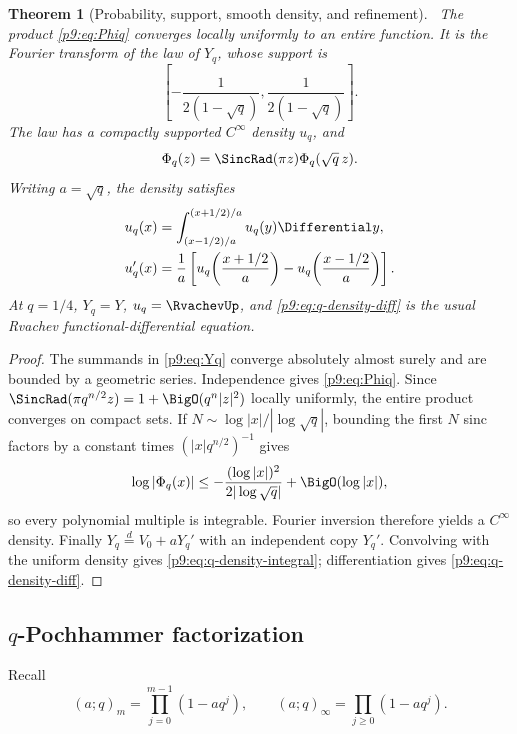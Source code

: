 \documentclass[11pt]{article}
\numberwithin{equation}{section}
\newtheorem{theorem}{Theorem}[section]
\theoremstyle{definition}
\theoremstyle{remark}
\begin{document}
\begin{theorem}[Probability, support, smooth density, and refinement]\label{p9:thm:q-density}
\statusN\ The product \eqref{p9:eq:Phiq} converges locally uniformly to an entire function.
It is the Fourier transform of the law of $Y_q$, whose support is
\[
 \left[-\frac1{2(1-\sqrt q)},\frac1{2(1-\sqrt q)}\right].
\]
The law has a compactly supported $C^\infty$ density $u_q$, and
\begin{equation}
 \Phi_q(z)=\SincRad(\pi z)\Phi_q(\sqrt q\,z).                 \label{p9:eq:q-refine-Fourier}
\end{equation}
Writing $a=\sqrt q$, the density satisfies
\begin{align}
 u_q(x)&=\int_{(x-1/2)/a}^{(x+1/2)/a}u_q(y)\Differential y,           \label{p9:eq:q-density-integral}\\
 u_q'(x)&=\frac1a\left[u_q\!\left(\frac{x+1/2}{a}\right)
                     -u_q\!\left(\frac{x-1/2}{a}\right)\right]. \label{p9:eq:q-density-diff}
\end{align}
At $q=1/4$, $Y_q=Y$, $u_q=\RvachevUp$, and \eqref{p9:eq:q-density-diff} is the usual Rvachev
functional-differential equation.
\end{theorem}

\begin{proof}
The summands in \eqref{p9:eq:Yq} converge absolutely almost surely and are bounded by a
geometric series.  Independence gives \eqref{p9:eq:Phiq}.  Since
$\SincRad(\pi q^{n/2}z)=1+\BigO(q^n|z|^2)$ locally uniformly, the entire product converges on
compact sets.  If $N\sim\log|x|/|\log\sqrt q|$, bounding the first $N$ sinc factors by a
constant times $(|x|q^{n/2})^{-1}$ gives
\[
 \log|\Phi_q(x)|\le-\frac{(\log|x|)^2}{2|\log\sqrt q|}+\BigO(\log|x|),
\]
so every polynomial multiple is integrable.  Fourier inversion therefore yields a
$C^\infty$ density.  Finally $Y_q\overset d=V_0+aY_q'$ with an independent copy $Y_q'$.
Convolving with the uniform density gives \eqref{p9:eq:q-density-integral}; differentiation
gives \eqref{p9:eq:q-density-diff}.
\end{proof}

\subsection{$q$-Pochhammer factorization}
Recall
\[
 (a;q)_m=\prod_{j=0}^{m-1}(1-aq^j),\qquad
 (a;q)_\infty=\prod_{j\ge0}(1-aq^j).
\]
\end{document}

